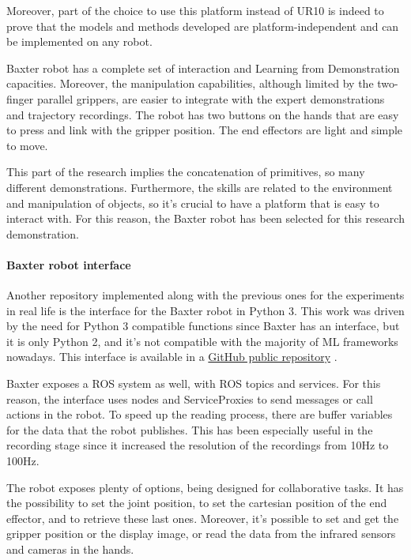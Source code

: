 Moreover, part of the choice to use this platform instead of UR10 is indeed to prove that the models and methods developed are platform-independent and can be implemented on any robot. 

Baxter robot has a complete set of interaction and Learning from Demonstration capacities. Moreover, the manipulation capabilities, although limited by the two-finger parallel grippers, are easier to integrate with the expert demonstrations and trajectory recordings. The robot has two buttons on the hands that are easy to press and link with the gripper position. The end effectors are light and simple to move. 

This part of the research implies the concatenation of primitives, so many different demonstrations. Furthermore, the skills are related to the environment and manipulation of objects, so it's crucial to have a platform that is easy to interact with. For this reason, the Baxter robot has been selected for this research demonstration.

\paragraph{Baxter robot interface} Another repository implemented along with the previous ones for the experiments in real life is the interface for the Baxter robot in Python 3. This work was driven by the need for Python 3 compatible functions since Baxter has an interface, but it is only Python 2, and it's not compatible with the majority of ML frameworks nowadays. This interface is available in a \href{https://github.com/igor-lirussi/baxter-python3}{GitHub public repository} \cite{url:Baxterrepo}. 

Baxter exposes a ROS system as well, with ROS topics and services. For this reason, the interface uses nodes and ServiceProxies to send messages or call actions in the robot. To speed up the reading process, there are buffer variables for the data that the robot publishes. This has been especially useful in the recording stage since it increased the resolution of the recordings from 10Hz to 100Hz.

The robot exposes plenty of options, being designed for collaborative tasks. It has the possibility to set the joint position, to set the cartesian position of the end effector, and to retrieve these last ones. Moreover, it's possible to set and get the gripper position or the display image, or read the data from the infrared sensors and cameras in the hands. 

